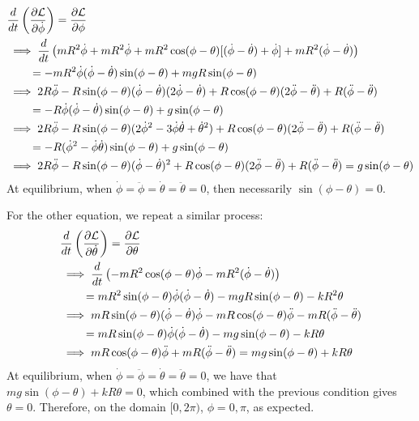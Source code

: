 \documentclass[12pt]{scrartcl}
\begin{document}
\begin{align*}
    &\frac{d }{d t}\left(\frac{\partial \mathcal{L}}{\partial \dot\phi}\right) = \frac{\partial \mathcal{L}}{\partial \phi}\\
    &\implies \frac{d }{d t} \left(mR^2 \dot \phi + mR^2 \dot \phi + mR^2 \cos(\phi - \theta)[(\dot \phi - \dot \theta) + \dot \phi] + mR^2(\dot \phi - \dot \theta) \right) \\ 
    & \quad \quad = - mR^2 \dot \phi (\dot \phi - \dot \theta) \sin(\phi - \theta) + mgR \sin(\phi - \theta)\\
    &\implies 2R \ddot{\phi} - R\sin(\phi - \theta)(\dot \phi - \dot \theta)(2\dot \phi - \dot \theta) + R \cos(\phi - \theta)(2 \ddot \phi - \ddot \theta) + R (\ddot \phi - \ddot \theta) \\ 
    & \quad \quad =  - R \dot \phi (\dot \phi - \dot \theta) \sin(\phi - \theta) + g \sin(\phi - \theta)\\
    & \implies 2R \ddot{\phi} - R \sin(\phi - \theta)(2\dot \phi^2 - 3 \dot \phi \dot \theta + \dot \theta^2) + R \cos(\phi - \theta)(2 \ddot \phi - \ddot \theta) + R (\ddot \phi - \ddot \theta)\\
    & \quad \quad = - R (\dot \phi^2 - \dot \phi \dot \theta) \sin(\phi - \theta) + g \sin(\phi - \theta)\\
    & \implies 2R \ddot{\phi} - R \sin(\phi - \theta)(\dot \phi - \dot \theta)^2 + R \cos(\phi - \theta)(2 \ddot \phi - \ddot \theta) + R (\ddot \phi - \ddot \theta) = g \sin(\phi - \theta)
\end{align*}
At equilibrium, when $\dot \phi = \ddot \phi = \dot \theta = \ddot \theta = 0$, then necessarily $\sin(\phi - \theta) = 0$. 

For the other equation, we repeat a similar process:
\begin{align*}
    &\frac{d }{d t}\left(\frac{\partial \mathcal{L}}{\partial \dot\theta}\right) = \frac{\partial \mathcal{L}}{\partial \theta}\\
    &\implies \frac{d }{d t} \left(-mR^2\cos(\phi - \theta)\dot \phi - mR^2(\dot \phi - \dot \theta)  \right) \\
    & \quad \quad = mR^2\sin(\phi - \theta)\dot \phi(\dot \phi - \dot \theta) - mgR \sin(\phi - \theta) - kR^2 \theta \\
    &\implies mR\sin(\phi - \theta)(\dot \phi - \dot \theta)\dot \phi - mR \cos(\phi - \theta) \ddot \phi - mR(\ddot \phi - \ddot \theta) \\
    & \quad \quad = mR \sin(\phi - \theta)\dot \phi(\dot \phi - \dot \theta) - mg \sin(\phi - \theta) - kR \theta \\
    & \implies mR \cos(\phi - \theta) \ddot \phi + mR(\ddot \phi - \ddot \theta) = mg \sin(\phi - \theta) + kR\theta
\end{align*}
At equilibrium, when $\dot \phi = \ddot \phi = \dot \theta = \ddot \theta = 0$, we have that $mg \sin (\phi - \theta) + kR \theta = 0$, which combined with the previous condition gives $\theta = 0$. Therefore, on the domain $[0, 2\pi)$, $\phi = 0, \pi$, as expected. 
\end{document}
